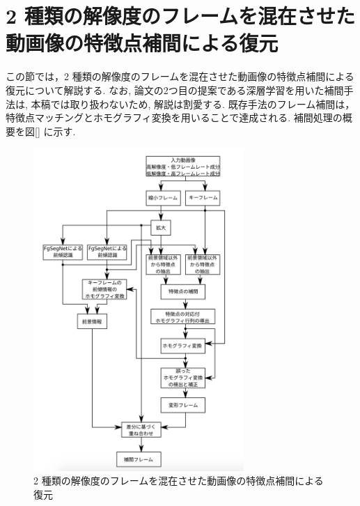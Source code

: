 \documentclass[a4paper,12pt]{jsreport}
\begin{document}
\section{2 種類の解像度のフレームを混在させた動画像の特徴点補間による復元}
この節では，2 種類の解像度のフレームを混在させた動画像の特徴点補間による復元\cite{Ukihashi}について解説する. なお, 論文\cite{Ukihashi}の2つ目の提案である深層学習を用いた補間手法は, 本稿では取り扱わないため, 解説は割愛する.  既存手法のフレーム補間は，特徴点マッチングとホモグラフィ変換を用いることで達成される. 補間処理の概要を図[] に示す. 

\begin{figure}[h]
  \begin{center}
    \includegraphics[width=8cm]{./kizonshuhou_zentaizou.png}
    \caption{2 種類の解像度のフレームを混在させた動画像の特徴点補間による復元}
  \end{center}
\end{figure}
\end{document}
